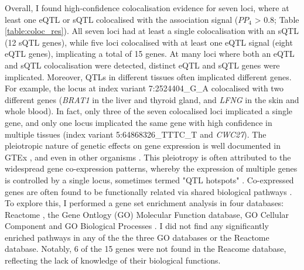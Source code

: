 Overall, I found high-confidence colocalisation evidence for seven loci, where at least one eQTL or sQTL colocalised with the association signal ($PP_{4}$ > 0.8; Table \ref{table:coloc_res}). All seven loci had at least a single colocalisation with an sQTL (12 sQTL genes), while five loci colocalised with at least one eQTL signal (eight eQTL genes), implicating a total of 15 genes. At many loci where both an eQTL and sQTL colocalisation were detected, distinct eQTL and sQTL genes were implicated. Moreover, QTLs in different tissues often implicated different genes. For example, the locus at index variant 7:2524404\_G\_A colocalised with two different genes (\textit{BRAT1} in the liver and thyroid gland, and \textit{LFNG} in the skin and whole blood). In fact, only three of the seven colocalised loci implicated a single gene, and only one locus implicated the same gene with high confidence in multiple tissues (index variant 5:64868326\_TTTC\_T and \textit{CWC27}). The pleiotropic nature of genetic effects on gene expression is well documented in GTEx \cite{Ribeiro2021-xj}, and even in other organisms \cite{Brem2002-zj,Schadt2003-ei}. This pleiotropy is often attributed to the widespread gene co-expression patterns, whereby the expression of multiple genes is controlled by a single locus, sometimes termed "QTL hotspots" \cite{Tian2016-hy}. Co-expressed genes are often found to be functionally related via shared biological pathways \cite{Van_Dam2017-vm,Westra2013-mm}. To explore this, I performed a gene set enrichment analysis in four databases: Reactome \cite{Gillespie2022-jr}, the Gene Ontlogy (GO) Molecular Function database, GO Cellular Component and GO Biological Processes \cite{Thomas2022-nb}. I did not find any significantly enriched pathways in any of the the three GO databases or the Reactome database. Notably, 6 of the 15 genes were not found in the Reacome database, reflecting the lack of knowledge of their biological functions. 



